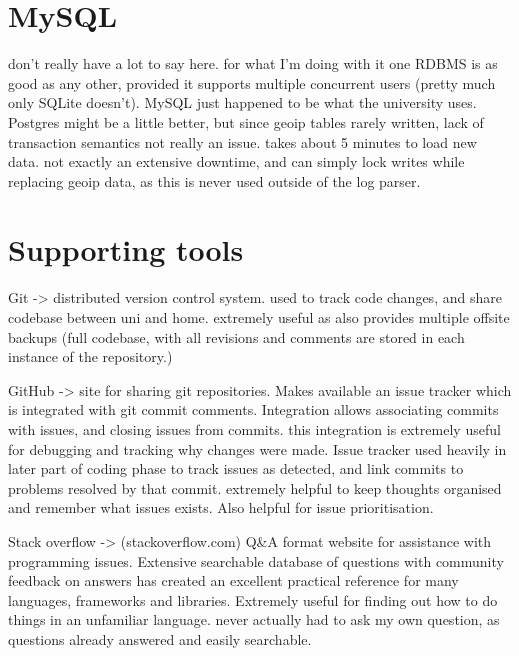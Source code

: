 \section{MySQL}

don't really have a lot to say here. for what I'm doing with it one RDBMS is as good as any other, provided it supports multiple concurrent users (pretty much only SQLite doesn't).
MySQL just happened to be what the university uses. Postgres might be a little better, but since geoip tables rarely written, lack of transaction semantics not really an issue. takes about 5 minutes to load new data. not exactly an extensive downtime, and can simply lock writes while replacing geoip data, as this is never used outside of the log parser.

\section{Supporting tools}
Git -> distributed version control system. used to track code changes, and share codebase between uni and home. extremely useful as also provides multiple offsite backups (full codebase, with all revisions and comments are stored in each instance of the repository.)

GitHub -> site for sharing git repositories. Makes available an issue tracker which is integrated with git commit comments. Integration allows associating commits with issues, and closing issues from commits. this integration is extremely useful for debugging and tracking why changes were made. Issue tracker used heavily in later part of coding phase to track issues as detected, and link commits to problems resolved by that commit.
extremely helpful to keep thoughts organised and remember what issues exists. Also helpful for issue prioritisation.

Stack overflow -> (stackoverflow.com) Q\&A format website for assistance with programming issues. Extensive searchable database of questions with community feedback on answers has created an excellent practical reference for many languages, frameworks and libraries.  Extremely useful for finding out how to do things in an unfamiliar language. never actually had to ask my own question, as questions already answered and easily searchable.